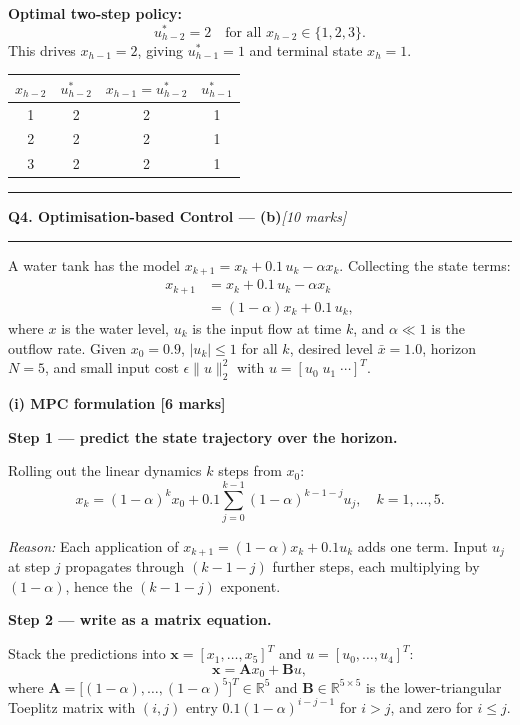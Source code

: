 \documentclass[10pt,a4paper]{article}
\newcommand{\sectitle}[2]{%
  \vspace{10pt}\noindent\rule{\linewidth}{0.8pt}\par\vspace{2pt}%
  {\large\textbf{#1}\hfill\normalsize\textit{[#2 marks]}}\par
  \vspace{2pt}\rule{\linewidth}{0.4pt}\vspace{4pt}}
\newcommand{\reason}[1]{%
  \begin{mdframed}[backgroundcolor=reasonbg, linewidth=0.4pt,
    innertopmargin=3pt, innerbottommargin=3pt,
    innerleftmargin=6pt, innerrightmargin=6pt]
    \small\textit{Reason:} \small #1
  \end{mdframed}\vspace{2pt}}
\newenvironment{resultbox}{%
  \begin{mdframed}[backgroundcolor=boxbg, linewidth=0.6pt,
    innertopmargin=5pt, innerbottommargin=5pt,
    innerleftmargin=8pt, innerrightmargin=8pt]
}{\end{mdframed}}
\begin{document}
\begin{resultbox}
\textbf{Optimal two-step policy:}
\[
  u^*_{h-2} = 2 \quad\text{for all }x_{h-2}\in\{1,2,3\}.
\]
This drives $x_{h-1}=2$, giving $u^*_{h-1}=1$ and terminal state $x_h=1$.

\medskip
\begin{center}
\begin{tabular}{c|cc|c}
$x_{h-2}$ & $u^*_{h-2}$ & $x_{h-1}=u^*_{h-2}$ & $u^*_{h-1}$ \\\hline
1 & 2 & 2 & 1 \\
2 & 2 & 2 & 1 \\
3 & 2 & 2 & 1 \\
\end{tabular}
\end{center}
\end{resultbox}

\newpage
\sectitle{Q4. Optimisation-based Control --- (b)}{10}

\noindent A water tank has the model $x_{k+1} = x_k + 0.1\,u_k - \alpha x_k$.
Collecting the state terms:
\begin{align*}
  x_{k+1} &= x_k + 0.1\,u_k - \alpha x_k \\
           &= (1-\alpha)x_k + 0.1\,u_k,
\end{align*}
where $x$ is the water level, $u_k$ is the input flow at time $k$, and $\alpha\ll 1$ is the
outflow rate. Given $x_0=0.9$, $|u_k|\le 1$ for all $k$, desired level $\bar{x}=1.0$,
horizon $N=5$, and small input cost $\epsilon\|u\|_2^2$ with $u=[u_0\;u_1\;\cdots]^T$.

\bigskip
\noindent\textbf{(i) MPC formulation [6 marks]}

\textbf{Step 1 --- predict the state trajectory over the horizon.}

Rolling out the linear dynamics $k$ steps from $x_0$:
\[
  x_k = (1-\alpha)^k x_0 + 0.1\sum_{j=0}^{k-1}(1-\alpha)^{k-1-j}u_j,
  \quad k=1,\ldots,5.
\]

\reason{Each application of $x_{k+1}=(1-\alpha)x_k+0.1u_k$ adds one term.
        Input $u_j$ at step $j$ propagates through $(k-1-j)$ further steps,
        each multiplying by $(1-\alpha)$, hence the $(k-1-j)$ exponent.}

\textbf{Step 2 --- write as a matrix equation.}

Stack the predictions into $\mathbf{x}=[x_1,\ldots,x_5]^T$ and $u=[u_0,\ldots,u_4]^T$:
\[
  \mathbf{x} = \mathbf{A}x_0 + \mathbf{B}u,
\]
where $\mathbf{A}=\bigl[(1-\alpha),\ldots,(1-\alpha)^5\bigr]^T\in\mathbb{R}^5$ and
$\mathbf{B}\in\mathbb{R}^{5\times 5}$ is the lower-triangular Toeplitz matrix with
$(i,j)$ entry $0.1(1-\alpha)^{i-j-1}$ for $i>j$, and zero for $i\le j$.
\end{document}
